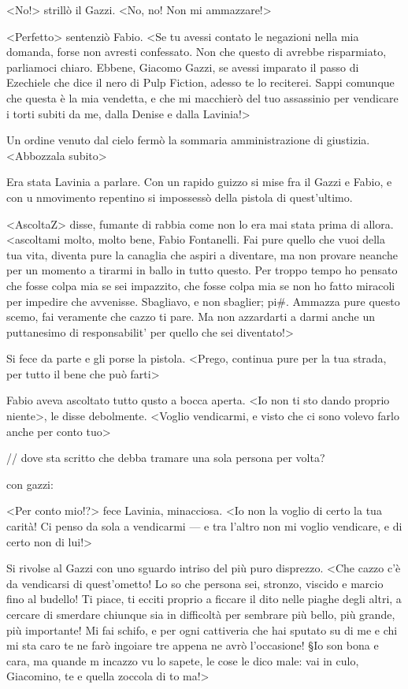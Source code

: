 <No!> strillò il Gazzi. <No, no! Non mi ammazzare!>

<Perfetto> sentenziò Fabio. <Se tu avessi contato le negazioni nella mia domanda, forse non avresti confessato. Non che questo di avrebbe risparmiato, parliamoci chiaro. Ebbene, Giacomo Gazzi, se avessi imparato il passo di Ezechiele che dice il nero di Pulp Fiction, adesso te lo reciterei. Sappi comunque che questa è la mia vendetta, e che mi macchierò del tuo assassinio per vendicare i torti subiti da me, dalla Denise e dalla Lavinia!>

Un ordine venuto dal cielo fermò la sommaria amministrazione di giustizia. <Abbozzala subito>

Era stata Lavinia a parlare. Con un rapido guizzo si mise fra il Gazzi e Fabio, e con u nmovimento repentino si impossessò della pistola di quest'ultimo.

<AscoltaZ> disse, fumante di rabbia come non lo era mai stata prima di allora. <ascoltami molto, molto bene, Fabio Fontanelli. Fai pure quello che vuoi della tua vita, diventa pure la canaglia che aspiri a diventare, ma non provare neanche per un momento a tirarmi in ballo in tutto questo. Per troppo tempo ho pensato che fosse colpa mia se sei impazzito, che fosse colpa mia se non ho fatto miracoli per impedire che avvenisse. Sbagliavo, e non sbaglier; pi#. Ammazza pure questo scemo, fai veramente che cazzo ti pare. Ma non azzardarti a darmi anche un puttanesimo di responsabilit' per quello che sei diventato!>

Si fece da parte e gli porse la pistola. <Prego, continua pure per la tua strada, per tutto il bene che può farti>

Fabio aveva ascoltato tutto qusto a bocca aperta. <Io non ti sto dando proprio niente>, le disse debolmente. <Voglio vendicarmi, e visto che ci sono volevo farlo anche per conto tuo>

// dove sta scritto che debba tramare una sola persona per volta?

con gazzi:

<Per conto mio!?> fece Lavinia, minacciosa. <Io non la voglio di certo la tua carità! Ci penso da sola a vendicarmi --- e tra l'altro non mi voglio vendicare, e di certo non di lui!>

Si rivolse al Gazzi con uno sguardo intriso del più puro disprezzo. <Che cazzo c'è da vendicarsi di quest'ometto! Lo so che persona sei, stronzo, viscido e marcio fino al budello! Ti piace, ti ecciti proprio a ficcare il dito nelle piaghe degli altri, a cercare di smerdare chiunque sia in difficoltà per sembrare più bello, più grande, più importante! Mi fai schifo, e per ogni cattiveria che hai sputato su di me e chi mi sta caro te ne farò ingoiare tre appena ne avrò l'occasione! §Io son bona e cara, ma quande m incazzo vu lo sapete, le cose le dico male: vai in culo, Giacomino, te e quella zoccola di to ma!>

